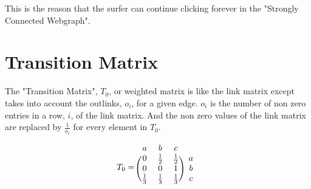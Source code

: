\documentclass[12pt]{article}
\begin{document}
This is the reason that the surfer can continue clicking forever in the "Strongly Connected Webgraph".

%
%
\section{Transition Matrix}

\begin{center}
\end{center}

The "Transition Matrix", $T_0$, or weighted matrix is like the link matrix except takes into account the outlinks, $o_i$, for a given edge. $o_i$ is the number of non zero entries in a row, $i$, of the link matrix. And the non zero values of the link matrix are replaced by $\frac{1}{o_i}$ for every element in $T_0$.

\[
T_0 = 
\begin{blockarray}{cccc}
a & b & c \\
\begin{block}{(ccc)c}
  0 & \frac{1}{2} & \frac{1}{2} & a \\
  0 & 0 & 1 & b \\
  \frac{1}{3} & \frac{1}{3} & \frac{1}{3} & c \\
\end{block}
\end{blockarray}
\]
\end{document}
